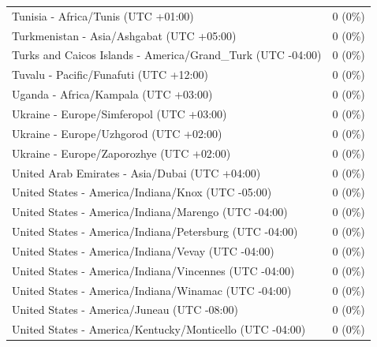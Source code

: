 \documentclass[
  english,
  man]{apa6}
\begin{document}
\begin{appendix}
\begin{table}
{\begin{tabular}[t]{ll}
\hspace{1em}Tunisia - Africa/Tunis (UTC +01:00) & 0 (0\%)\\
\addlinespace
\hspace{1em}Turkmenistan - Asia/Ashgabat (UTC +05:00) & 0 (0\%)\\
\hspace{1em}Turks and Caicos Islands - America/Grand\_Turk (UTC -04:00) & 0 (0\%)\\
\hspace{1em}Tuvalu - Pacific/Funafuti (UTC +12:00) & 0 (0\%)\\
\hspace{1em}Uganda - Africa/Kampala (UTC +03:00) & 0 (0\%)\\
\hspace{1em}Ukraine - Europe/Simferopol (UTC +03:00) & 0 (0\%)\\
\addlinespace
\hspace{1em}Ukraine - Europe/Uzhgorod (UTC +02:00) & 0 (0\%)\\
\hspace{1em}Ukraine - Europe/Zaporozhye (UTC +02:00) & 0 (0\%)\\
\hspace{1em}United Arab Emirates - Asia/Dubai (UTC +04:00) & 0 (0\%)\\
\hspace{1em}United States - America/Indiana/Knox (UTC -05:00) & 0 (0\%)\\
\hspace{1em}United States - America/Indiana/Marengo (UTC -04:00) & 0 (0\%)\\
\addlinespace
\hspace{1em}United States - America/Indiana/Petersburg (UTC -04:00) & 0 (0\%)\\
\hspace{1em}United States - America/Indiana/Vevay (UTC -04:00) & 0 (0\%)\\
\hspace{1em}United States - America/Indiana/Vincennes (UTC -04:00) & 0 (0\%)\\
\hspace{1em}United States - America/Indiana/Winamac (UTC -04:00) & 0 (0\%)\\
\hspace{1em}United States - America/Juneau (UTC -08:00) & 0 (0\%)\\
\addlinespace
\hspace{1em}United States - America/Kentucky/Monticello (UTC -04:00) & 0 (0\%)\\

\end{tabular}}
\end{table}
\end{appendix}
\end{document}
